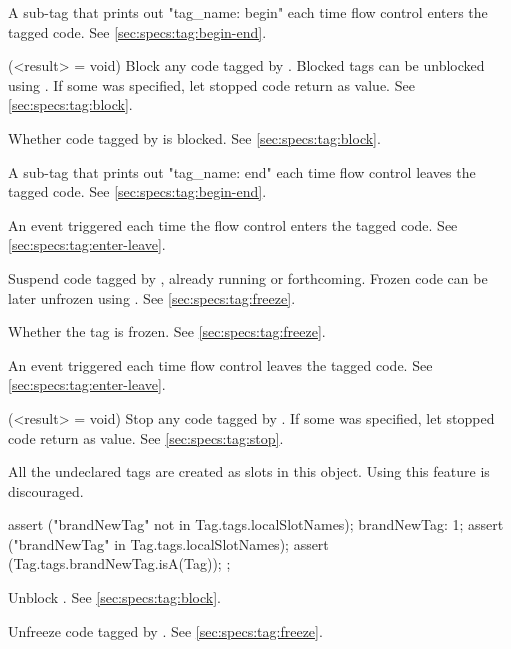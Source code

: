 \begin{urbiscriptapi}
\item[begin]
  A sub-tag that prints out "tag\_name: begin" each time flow control
  enters the tagged code. See \autoref{sec:specs:tag:begin-end}.

\item[block](<result> = void)%
  Block any code tagged by \this.  Blocked tags can be
  unblocked using .  If some  was
  specified, let stopped code return  as value.  See
  \autoref{sec:specs:tag:block}.

\item[blocked]
  Whether code tagged by \this is blocked.  See
  \autoref{sec:specs:tag:block}.

\item[end]
  A sub-tag that prints out "tag\_name: end" each time flow control
  leaves the tagged code. See \autoref{sec:specs:tag:begin-end}.

\item[enter] An event triggered each time the flow control enters the
  tagged code.  See \autoref{sec:specs:tag:enter-leave}.

\item[freeze] Suspend code tagged by \this, already running or
  forthcoming.  Frozen code can be later unfrozen using .
  See \autoref{sec:specs:tag:freeze}.

\item[frozen]
  Whether the tag is frozen. See  \autoref{sec:specs:tag:freeze}.

\item[leave] An event triggered each time flow control leaves the
  tagged code.  See \autoref{sec:specs:tag:enter-leave}.

\item[stop](<result> = void)%
  Stop any code tagged by \this.  If some  was
  specified, let stopped code return  as value.
  See \autoref{sec:specs:tag:stop}.

\item[tags] All the undeclared tags are created as slots in this
  object.  Using this feature is discouraged.
\begin{urbiscript}
{
  assert ("brandNewTag" not in Tag.tags.localSlotNames);
  brandNewTag: 1;
  assert ("brandNewTag" in Tag.tags.localSlotNames);
  assert (Tag.tags.brandNewTag.isA(Tag));
};
\end{urbiscript}

\item[unblock]
  Unblock \this.  See \autoref{sec:specs:tag:block}.

\item[unfreeze]
  Unfreeze code tagged by \this.  See
  \autoref{sec:specs:tag:freeze}.
\end{urbiscriptapi}

